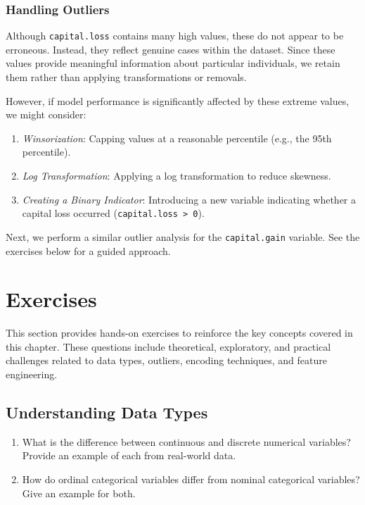 \documentclass[
  11pt,
]{book}
\providecommand{\tightlist}{%
  \setlength{\itemsep}{0pt}\setlength{\parskip}{0pt}}
\theoremstyle{definition}
\theoremstyle{definition}
\theoremstyle{definition}
\theoremstyle{definition}
\theoremstyle{remark}
\begin{document}
\subsubsection*{Handling Outliers}\label{handling-outliers}


Although \texttt{capital.loss} contains many high values, these do not appear to be erroneous. Instead, they reflect genuine cases within the dataset. Since these values provide meaningful information about particular individuals, we retain them rather than applying transformations or removals.

However, if model performance is significantly affected by these extreme values, we might consider:

\begin{enumerate}
\def\labelenumi{\arabic{enumi}.}
\tightlist
\item
  \emph{Winsorization}: Capping values at a reasonable percentile (e.g., the 95th percentile).\\
\item
  \emph{Log Transformation}: Applying a log transformation to reduce skewness.\\
\item
  \emph{Creating a Binary Indicator}: Introducing a new variable indicating whether a capital loss occurred (\texttt{capital.loss\ \textgreater{}\ 0}).
\end{enumerate}

Next, we perform a similar outlier analysis for the \texttt{capital.gain} variable. See the exercises below for a guided approach.

\section{Exercises}\label{exercises-1}

This section provides hands-on exercises to reinforce the key concepts covered in this chapter. These questions include theoretical, exploratory, and practical challenges related to data types, outliers, encoding techniques, and feature engineering.

\subsection*{Understanding Data Types}\label{understanding-data-types}


\begin{enumerate}
\def\labelenumi{\arabic{enumi}.}
\tightlist
\item
  What is the difference between continuous and discrete numerical variables? Provide an example of each from real-world data.\\
\item
  How do ordinal categorical variables differ from nominal categorical variables? Give an example for both.
\end{enumerate}
\end{document}
